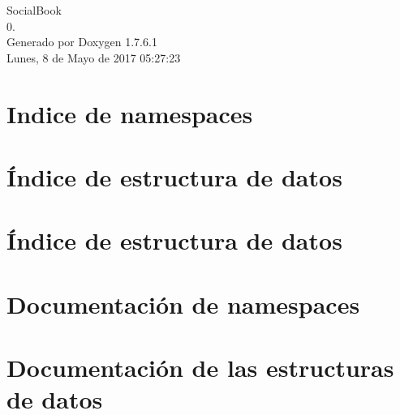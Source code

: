 \documentclass[a4paper]{book}
\begin{document}
\hypersetup{pageanchor=false,citecolor=blue}
\begin{titlepage}
\vspace*{7cm}
\begin{center}
{\Large \-Social\-Book \\[1ex]\large 0. }\\
\vspace*{1cm}
{\large \-Generado por Doxygen 1.7.6.1}\\
\vspace*{0.5cm}
{\small Lunes, 8 de Mayo de 2017 05:27:23}\\
\end{center}
\end{titlepage}
\clearemptydoublepage
{}
\tableofcontents
\clearemptydoublepage
{}
\hypersetup{pageanchor=true,citecolor=blue}
\chapter{\-Indice de namespaces}

\chapter{Índice de estructura de datos}

\chapter{Índice de estructura de datos}

\chapter{\-Documentación de namespaces}

\chapter{\-Documentación de las estructuras de datos}































\printindex
\end{document}
